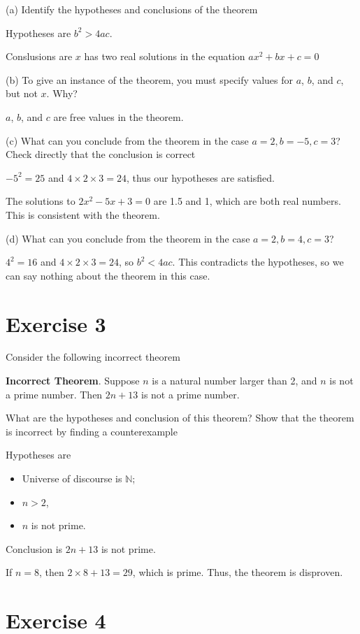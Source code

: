 \documentclass[11pt]{article}
\begin{document}
\noindent (a) Identify the hypotheses and conclusions of the theorem

Hypotheses are $b^2 > 4ac$.

Conslusions are $x$ has two real solutions in the equation $ax^2 + bx + c = 0$

\noindent (b) To give an instance of the theorem, you must specify values for 
$a$, $b$, and $c$, but not $x$. Why?

$a$, $b$, and $c$ are free values in the theorem.

\noindent (c) What can you conclude from the theorem in the case $a=2, b=-5, 
c=3$? Check directly that the conclusion is correct

$-5^2 = 25$ and $4 \times 2 \times 3 = 24$, thus our hypotheses are satisfied.

The solutions to $2x^2 -5x + 3 = 0$ are 1.5 and 1, which are both real numbers.
This is consistent with the theorem.

\noindent (d) What can you conclude from the theorem in the case $a=2, b=4, c=3$?

$4^2 = 16$ and $4 \times 2 \times 3 = 24$, so $b^2 < 4ac$. This contradicts the 
hypotheses, so we can say nothing about the theorem in this case.

\section*{Exercise 3}

Consider the following incorrect theorem

\textbf{Incorrect Theorem}. Suppose $n$ is a natural number larger than 2, and 
$n$ is not a prime number. Then $2n + 13$ is not a prime number.

What are the hypotheses and conclusion of this theorem? Show that the theorem is 
incorrect by finding a counterexample

Hypotheses are 

\begin{itemize}
    \item Universe of discourse is $\mathbb{N}$;
    \item $n > 2$,
    \item $n$ is not prime.
\end{itemize}

Conclusion is $2n + 13$ is not prime.

If $n=8$, then $2 \times 8 + 13 = 29$, which is prime. Thus, the theorem is 
disproven.

\section*{Exercise 4}
\end{document}
